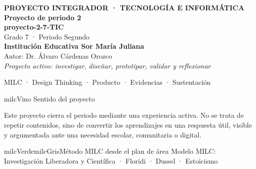 \documentclass[11pt,letterpaper]{article}
\begin{document}
\thispagestyle{empty}

\vspace*{.85cm}
\begin{tcolorbox}[
  enhanced,colback=milcVino,colframe=milcVino,arc=12mm,width=.86\textwidth,
  boxrule=0pt,left=12mm,right=12mm,top=11mm,bottom=11mm,center,
  overlay={\draw[milcMagenta,line width=2pt,dash pattern=on 9pt off 8pt,rounded corners=10mm]
  ([xshift=7mm,yshift=-7mm]frame.north west) rectangle ([xshift=-7mm,yshift=7mm]frame.south east);}]
  \centering
  {\sffamily\bfseries\color{white}\fontsize{15}{17}\selectfont PROYECTO INTEGRADOR · TECNOLOGÍA E INFORMÁTICA}\\[1.0cm]
  {\sffamily\bfseries\color{white}\fontsize{30}{33}\selectfont Proyecto de periodo 2}\\[3mm]
  {\sffamily\bfseries\color{milcMostaza}\fontsize{25}{28}\selectfont proyecto-2-7-TIC}\\[8mm]
  {\sffamily\color{white}\Large Grado 7 · Periodo Segundo}\\[1.0cm]
  {\sffamily\bfseries\color{white}\large Institución Educativa Sor María Juliana}\\[2mm]
  {\sffamily\color{white}Autor: Dr. Álvaro Cárdenas Orozco}\\[4mm]
  {\sffamily\itshape\color{white}Proyecto activo: investigar, diseñar, prototipar, validar y reflexionar}
\end{tcolorbox}
\vfill
\begin{tcolorbox}[enhanced,colback=milcVino!72!black,colframe=milcVino!72!black,arc=5mm,boxrule=0pt,width=.86\textwidth,left=6mm,right=6mm,top=4mm,bottom=4mm,center]
{\color{white}\sffamily\small MILC · Design Thinking · Producto · Evidencias · Sustentación}
\end{tcolorbox}

\newpage
\begin{titlebox}{milcVino}
Sentido del proyecto
\end{titlebox}
\begin{multicols}{2}
Este proyecto cierra el periodo mediante una experiencia activa. No se trata de repetir contenidos, sino de convertir los aprendizajes en una respuesta útil, visible y argumentada ante una necesidad escolar, comunitaria o digital.

\columnbreak
\begin{softbox}{milcVerde}{milcGris}{Método MILC desde el plan de área}
Modelo MILC: Investigación Liberadora y Científica · Floridi · Dussel · Estoicismo
\end{softbox}
\end{multicols}
\end{document}
